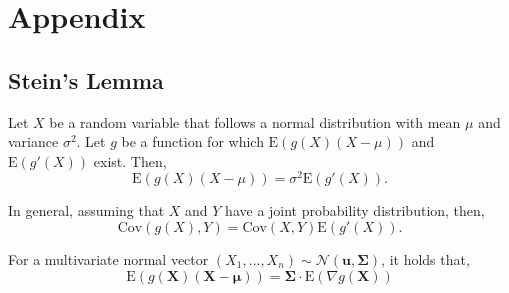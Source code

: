 \documentclass{article}
\begin{document}
\newpage
\section{Appendix}

\subsection{Stein's Lemma}
\label{sec: stein}

Let $X$ be a random variable that follows a normal distribution with mean $\mu$ and variance $\sigma^2$. Let $g$ be a function for which $\mathrm{E}\left(g(X)(X-\mu)\right)$ and $\mathrm{E}\left(g'(X)\right)$ exist. Then,
\begin{equation*}
	\mathrm{E}\left(g(X)(X-\mu)\right) =\sigma^{2}\mathrm{E}\left(g'(X)\right).
\end{equation*}

In general, assuming that $X$ and $Y$ have a joint probability distribution, then,
\begin{equation*}
	\mathrm{Cov}\left(g(X),Y\right) = \mathrm{Cov}(X,Y)\mathrm{E}(g'(X)).
\end{equation*}

For a multivariate normal vector $(X_{1},\dots,X_{n})\sim \mathcal{N}(\bm{u},\bm{\Sigma})$, it holds that,
\begin{equation}
	\mathrm{E}\left(g(\bm{X})(\bm{X}-\bm{\mu})\right) = \bm{\Sigma}\cdot \mathrm{E}\left(\nabla g(\bm{X})\right)\label{stein}
\end{equation}
\end{document}
